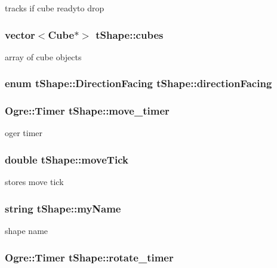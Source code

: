 tracks if cube readyto drop \hypertarget{classt_shape_a4007a5ffd638a42923b64d09c5d50a87}{
\subsubsection[{cubes}]{\setlength{\rightskip}{0pt plus 5cm}vector$<${\bf Cube}$\ast$$>$ t\-Shape\-::cubes}}\label{classt_shape_a4007a5ffd638a42923b64d09c5d50a87}
array of cube objects \hypertarget{classt_shape_a989a7205be02a011dae710470973a3c4}{
\subsubsection[{direction\-Facing}]{\setlength{\rightskip}{0pt plus 5cm}enum {\bf t\-Shape\-::\-Direction\-Facing}  t\-Shape\-::direction\-Facing}}\label{classt_shape_a989a7205be02a011dae710470973a3c4}
\hypertarget{classt_shape_a8da32e43eeb8ca2a96682ddfd95de45f}{
\subsubsection[{move\-\_\-timer}]{\setlength{\rightskip}{0pt plus 5cm}Ogre\-::\-Timer t\-Shape\-::move\-\_\-timer}}\label{classt_shape_a8da32e43eeb8ca2a96682ddfd95de45f}
oger timer \hypertarget{classt_shape_a01c34bd393df7caa86a4ff785a1775bd}{
\subsubsection[{move\-Tick}]{\setlength{\rightskip}{0pt plus 5cm}double t\-Shape\-::move\-Tick}}\label{classt_shape_a01c34bd393df7caa86a4ff785a1775bd}
stores move tick \hypertarget{classt_shape_ab461221e1ac0abdef5007a6516303d8e}{
\subsubsection[{my\-Name}]{\setlength{\rightskip}{0pt plus 5cm}string t\-Shape\-::my\-Name}}\label{classt_shape_ab461221e1ac0abdef5007a6516303d8e}
shape name \hypertarget{classt_shape_ae50ef7ba28f10ebe97ab2c431fa27c08}{
\subsubsection[{rotate\-\_\-timer}]{\setlength{\rightskip}{0pt plus 5cm}Ogre\-::\-Timer t\-Shape\-::rotate\-\_\-timer}}\label{classt_shape_ae50ef7ba28f10ebe97ab2c431fa27c08}
